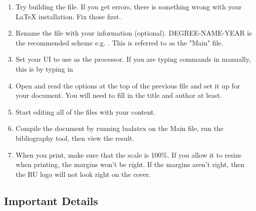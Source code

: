 \begin{enumerate}
 \item Try building the  file.  If you get errors, there
   is something wrong with your LaTeX installation.  Fix those first.

   
 \item Rename the  file with your information (optional).
   DEGREE-NAME-YEAR is the recommended scheme 
   e.g. .
   This is referred to as the "Main" file.
 \item Set your UI to use  as the processor.
   If you are typing commands in manually, this is by typing in 
   
 \item Open and read the options at the top of the previous file and set
   it up for your document.
   You will need to fill in the title and author at least.

 \item Start editing all of the  files with your content.

 \item Compile the document by running lualatex on the Main file, run the bibliography tool, then view the result.

 \item When you print, make sure that the scale is 100\%.
   If you allow it to resize when printing, the margins won't be right.
   If the  margins aren't right, then the RU logo will not look right on the
   cover.

\end{enumerate}

\subsection{Important Details}

